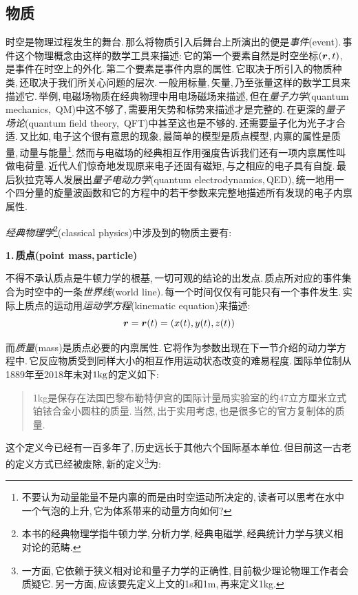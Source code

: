 \subsection{物质}

时空是物理过程发生的舞台.\,那么将物质引入后舞台上所演出的便是\emph{事件}(event).\,事件这个物理概念由这样的数学工具来描述:\,它的第一个要素自然是时空坐标$(\boldsymbol{r},t)$,\,是事件在时空上的外化.\,第二个要素是事件内禀的属性.\,它取决于所引入的物质种类,\,还取决于我们所关心问题的层次.\,一般用标量,\,矢量,\,乃至张量这样的数学工具来描述它.\,举例,\,电磁场物质在经典物理中用电场磁场来描述,\,但在\emph{量子力学}(quantum mechanics,\, QM)中这不够了,\,需要用矢势和标势来描述才是完整的.\,在更深的\emph{量子场论}(quantum field theory,\, QFT)中甚至这也是不够的.\,还需要量子化为光子才合适.\,又比如,\,电子这个很有意思的现象,\,最简单的模型是质点模型,\,内禀的属性是质量,\,动量与能量\footnote{不要认为动量能量不是内禀的而是由时空运动所决定的,\,读者可以思考在水中一个气泡的上升,\,它为体系带来的动量方向如何?}.\,然而与电磁场的经典相互作用强度告诉我们还有一项内禀属性叫做电荷量.\,近代人们惊奇地发现原来电子还固有磁矩,\,与之相应的电子具有自旋.\,最后狄拉克等人发展出\emph{量子电动力学}(quantum electrodynamics,\,QED),\,统一地用一个四分量的旋量波函数和它的方程中的若干参数来完整地描述所有发现的电子内禀属性.

\vspace{0.5cm}
\emph{经典物理学}\footnote{本书的经典物理学指牛顿力学,\,分析力学,\,经典电磁学,\,经典统计力学与狭义相对论的范畴.}(classical physics)中涉及到的物质主要有:

\vspace{0.2cm}
{\bf 1.\,质点(point mass,\,particle)}

不得不承认质点是牛顿力学的根基,\,一切可观的结论的出发点.\,质点所对应的事件集合为时空中的一条\emph{世界线}(world line).\,每一个时间仅仅有可能只有一个事件发生.\,实际上质点的运动用\emph{运动学方程}(kinematic equation)来描述:
\[\boldsymbol{r}=\boldsymbol{r}(t)=\left(x(t),y(t),z(t)\right)\]

而\emph{质量}(mass)是质点必要的内禀属性.\,它将作为参数出现在下一节介绍的动力学方程中.\,它反应物质受到同样大小的相互作用运动状态改变的难易程度.\,国际单位制从1889年至2018年末对$1\rm kg$的定义如下:

\begin{verse}
1kg是保存在法国巴黎布勒特伊宫的国际计量局实验室的约47立方厘米立式铂铱合金小圆柱的质量.\,当然,\,出于实用考虑,\,也是很多它的官方复制体的质量.
\end{verse}

这个定义今已经有一百多年了,\,历史远长于其他六个国际基本单位.\,但目前这一古老的定义方式已经被废除,\,新的定义\footnote{一方面,\,它依赖于狭义相对论和量子力学的正确性,\,目前极少理论物理工作者会质疑它.\,另一方面,\,应该要先定义上文的1s和1m,\,再来定义1kg.}为:

